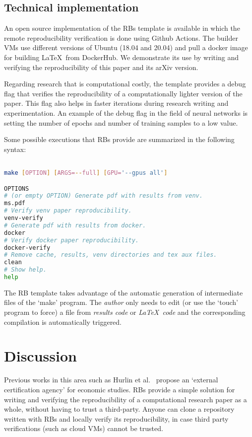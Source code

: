 \documentclass[journal]{IEEEtran}
\begin{document}
\subsection{Technical implementation}
An open source implementation of the RBs template is available in which the remote reproducibility verification is done using Github Actions.
The builder VMs use different versions of Ubuntu (18.04 and 20.04) and pull a docker image for building \LaTeX\ from DockerHub.
We demonstrate its use by writing and verifying the reproducibility of this paper and its arXiv version.

Regarding research that is computational costly, the template provides a debug flag that verifies the reproducibility of a computationally lighter version of the paper.
This flag also helps in faster iterations during research writing and experimentation.
An example of the debug flag in the field of neural networks is setting the number of epochs and number of training samples to a low value.

Some possible executions that RBs provide are summarized in the following syntax:
\begin{lstlisting}[language=Bash, style=lststyle, caption={Makefile call syntax from the shell.}, captionpos=b]

make [OPTION] [ARGS=--full] [GPU='--gpus all']

OPTIONS
# (or empty OPTION) Generate pdf with results from venv.
ms.pdf
# Verify venv paper reproducibility.
venv-verify
# Generate pdf with results from docker.
docker
# Verify docker paper reproducibility.
docker-verify
# Remove cache, results, venv directories and tex aux files.
clean
# Show help.
help
\end{lstlisting}

The RB template takes advantage of the automatic generation of intermediate files of the `make' program.
The \textit{author} only needs to edit (or use the `touch' program to force) a file from \textit{results code} or \textit{\LaTeX\ code} and the corresponding compilation is automatically triggered.

\section{Discussion}
Previous works in this area such as Hurlin et al.~\cite{hurlin2019reproducibility} propose an `external certification agency' for economic studies.
RBs provide a simple solution for writing and verifying the reproducibility of a computational research paper as a whole, without having to trust a third-party.
Anyone can clone a repository written with RBs and locally verify its reproducibility, in case third party verifications (such as cloud VMs) cannot be trusted.
\end{document}
